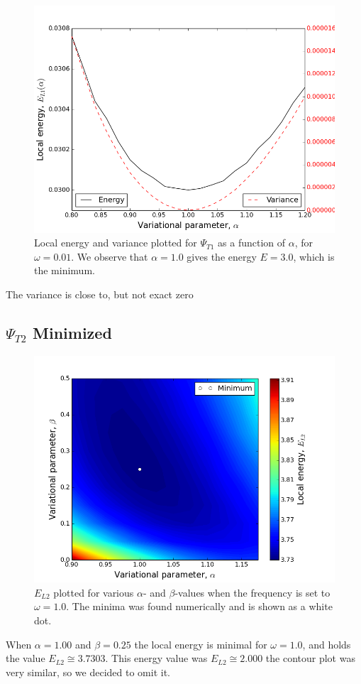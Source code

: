 \documentclass[norsk,a4paper,12pt]{article}
\begin{document}
\begin{figure} [H]
    \centering
    \includegraphics[scale=0.65]{E_L1_variance_omega=0_01_1e8.png}
    \caption{Local energy and variance plotted  for $\Psi_{T1}$ as a function of $\alpha$, for $\omega = 0.01$. We observe that $\alpha = 1.0$ gives the energy $E=3.0$, which is the minimum.}
    \label{fig:E_L1_file_omega=0_01}
\end{figure}
The variance is close to, but not exact zero


\subsection{$\Psi_{T2}$ Minimized}
\begin{figure} [H]
    \centering
    \includegraphics[width=12cm]{E_L2_contour_omega=1_0.png}
    \caption{$E_{L2}$ plotted for various $\alpha$- and $\beta$-values when the frequency is set to $\omega=1.0$. The minima was found numerically and is shown as a white dot.}
    \label{fig:E_L2_omega=1_0}
\end{figure}
When $\alpha=1.00$ and $\beta=0.25$ the local energy is minimal for $\omega=1.0$, and holds the value $E_{L2}\cong3.7303$.
This energy value was $E_{L2}\cong2.000$ the contour plot was very similar, so we decided to omit it. 
\end{document}
